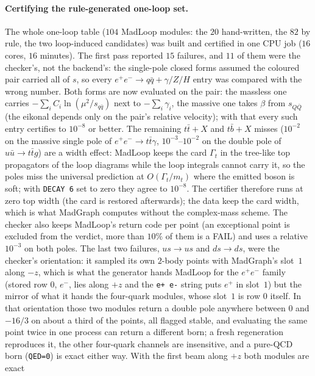 \documentclass[11pt]{article}
\newcommand{\code}[1]{\texttt{#1}}
\begin{document}
\paragraph{Certifying the rule-generated one-loop set.} The whole one-loop table ($104$ MadLoop
modules: the $20$ hand-written, the $82$ by rule, the two loop-induced candidates) was built and
certified in one CPU job ($16$ cores, $16$ minutes). The first pass reported $15$ failures, and
$11$ of them were the checker's, not the backend's: the single-pole closed forms assumed the
coloured pair carried all of $s$, so every $e^+e^-\to q\bar q+\gamma/Z/H$ entry was compared with
the wrong number. Both forms are now evaluated on the pair: the massless one carries
$-\sum_i C_i\ln(\mu^2/s_{q\bar q})$ next to $-\sum_i\gamma_i$, the massive one takes $\beta$ from
$s_{Q\bar Q}$ (the eikonal depends only on the pair's relative velocity); with that every such
entry certifies to $10^{-8}$ or better. The remaining $t\bar t+X$ and $t\bar b+X$ misses
($10^{-2}$ on the massive single pole of $e^+e^-\to t\bar t\gamma$, $10^{-3}$--$10^{-2}$ on the
double pole of $u\bar u\to t\bar tg$) are a width effect: MadLoop keeps the card $\Gamma_t$ in
the tree-like top propagators of the loop diagrams while the loop integrals cannot carry it, so
the poles miss the universal prediction at $O(\Gamma_t/m_t)$ where the emitted boson is soft;
with \code{DECAY 6} set to zero they agree to $10^{-8}$. The certifier therefore runs at zero top
width (the card is restored afterwards); the data keep the card width, which is what MadGraph
computes without the complex-mass scheme. The checker also keeps MadLoop's return code per
point (an exceptional point is excluded from the verdict, more than $10\%$ of them is a FAIL)
and uses a relative $10^{-3}$ on both poles. The last two failures, $us\to us$ and $ds\to ds$,
were the checker's orientation: it sampled its own $2$-body points with MadGraph's slot~$1$
along $-z$, which is what the generator hands MadLoop for the $e^+e^-$ family (stored row $0$,
$e^-$, lies along $+z$ and the \code{e+ e-} string puts $e^+$ in slot~$1$) but the mirror of
what it hands the four-quark modules, whose slot~$1$ is row $0$ itself. In that orientation those two modules return a double pole
anywhere between $0$ and $-16/3$ on about a third of the points, all flagged stable, and
evaluating the same point twice in one process can return a different born; a fresh
regeneration reproduces it, the other four-quark channels are insensitive, and a pure-QCD
born (\code{QED=0}) is exact either way. With the first beam along $+z$ both modules are exact
\end{document}
